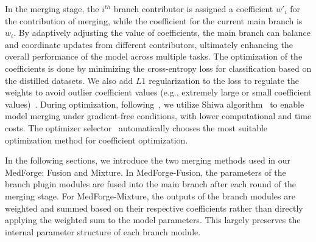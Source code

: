 In the merging stage, the $i^{th}$ branch contributor is assigned a coefficient $w'_i$ for the contribution of merging, while the coefficient for the current main branch is $w_i$. By adaptively adjusting the value of coefficients, the main branch can balance and coordinate updates from different contributors, ultimately enhancing the overall performance of the model across multiple tasks.
The optimization of the coefficients is done by minimizing the cross-entropy loss for classification based on the distilled datasets. We also add $L1$ regularization to the loss to regulate the weights to avoid outlier coefficient values (e.g., extremely large or small coefficient values)~\cite{huang2023lorahub}. During optimization, following~\cite{huang2023lorahub}, we utilize Shiwa algorithm~\cite{liu2020versatile} to enable model merging under gradient-free conditions, with lower computational and time costs. The optimizer selector~\cite{liu2020versatile} automatically chooses the most suitable optimization method for coefficient optimization. 

In the following sections, we introduce the two merging methods used in our MedForge: Fusion and Mixture. In MedForge-Fusion, the parameters of the branch plugin modules are fused into the main branch after each round of the merging stage. For MedForge-Mixture, the outputs of the branch modules are weighted and summed based on their respective coefficients rather than directly applying the weighted sum to the model parameters. This largely preserves the internal parameter structure of each branch module.

